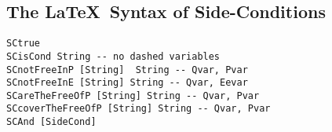 \newpage
\subsection{The \LaTeX\ Syntax of Side-Conditions}

\begin{verbatim}
SCtrue
SCisCond String -- no dashed variables
SCnotFreeInP [String]  String -- Qvar, Pvar
SCnotFreeInE [String] String -- Qvar, Eevar
SCareTheFreeOfP [String] String -- Qvar, Pvar
SCcoverTheFreeOfP [String] String -- Qvar, Pvar
SCAnd [SideCond]
\end{verbatim}

